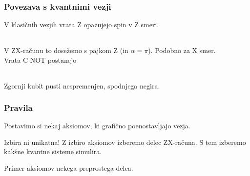 \documentclass[10pt]{beamer}
\begin{document}
\begin{frame}
  \frametitle{Povezava s kvantnimi vezji}
  V klasičnih vezjih vrata Z opazujejo spin v Z smeri.\\
  \\
  V ZX-računu to dosežemo s pajkom Z (in \(\alpha=\pi\)). Podobno za X smer.\\
  Vrata C-NOT postanejo\vspace{3mm}\\
  \\
  Zgornji kubit pusti nespremenjen, spodnjega negira.
\end{frame}
\begin{frame}
  \frametitle{Pravila}
  Postavimo si nekaj aksiomov, ki grafično poenostavljajo vezja.

  Izbira ni unikatna! Z izbiro aksiomov izberemo delec ZX-računa. S tem izberemo kakšne kvantne sisteme simulira.

  Primer aksiomov nekega preprostega delca.
\end{frame}
\end{document}
